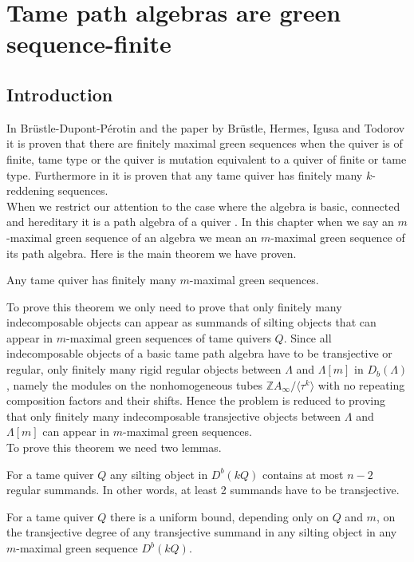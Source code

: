 \chapter{Tame path algebras are green sequence-finite}\label{C2}
\section{Introduction}
 In Br\"ustle-Dupont-P\'erotin \cite{BDP13} and the paper by Br\"ustle, Hermes, Igusa and Todorov \cite{BHIT15} it is proven that there are finitely maximal green sequences when the quiver is of finite, tame type or the quiver is mutation equivalent to a quiver of finite or tame type. Furthermore in \cite{BHIT15} it is proven that any tame quiver has finitely many $k$-reddening sequences.\\
\indent When we restrict our attention to the case where the algebra is basic, connected and hereditary it is a path algebra of a quiver \cite{ASS06}. In this chapter when we say an $m$-maximal green sequence of an algebra we mean an $m$-maximal green sequence of its path algebra. Here is the main theorem we have proven.\\
\begin{theorem}
Any tame quiver has finitely many $m$-maximal green sequences.\label{T:C3T}
\end{theorem}
\indent To prove this theorem we only need to prove that only finitely many indecomposable objects can appear as summands of silting objects that can appear in $m$-maximal green sequences of tame quivers $Q$. Since all indecomposable objects of a basic tame path algebra have to be transjective or regular, only finitely many rigid regular objects between $\Lambda$ and $\Lambda[m]$ in $D_b(\Lambda)$, namely the modules on the nonhomogeneous tubes $\mathbb{Z}A_\infty/\langle\tau^k\rangle$ with no repeating composition factors and their shifts. Hence the problem is reduced to proving that only finitely many indecomposable transjective objects between $\Lambda$ and $\Lambda[m]$ can appear in $m$-maximal green sequences.\\
\indent To prove this theorem we need two lemmas.\\
\begin{lemma}\label{def:C3L1}
For a tame quiver $Q$ any silting object in $D^b(kQ)$ contains at most $n-2$ regular summands. In other words, at least 2 summands have to be transjective. 
\end{lemma}
\begin{lemma}\label{def:C3L2}
For a tame quiver $Q$ there is a uniform bound, depending only on $Q$ and $m$, on the transjective degree of any transjective summand in any silting object in any $m$-maximal green sequence $D^b(kQ)$.
\end{lemma}
